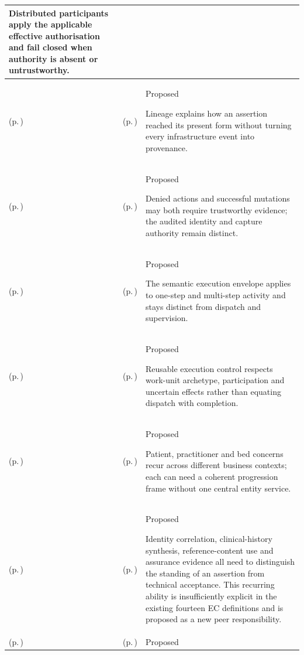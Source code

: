 \begin{longtable}{|>{\raggedright\arraybackslash}p{0.27\TableWidth}|>{\raggedright\arraybackslash}p{0.27\TableWidth}|>{\raggedright\arraybackslash}p{0.46\TableWidth}|}
Distributed participants apply the applicable effective authorisation and fail closed when authority is absent or untrustworthy.\\\hline
\nameref{cap:ec-07} (p.\,\pageref{cap:ec-07}) & \nameref{cap:ec-information-attribution-lineage} (p.\,\pageref{cap:ec-information-attribution-lineage}) & Proposed

Lineage explains how an assertion reached its present form without turning every infrastructure event into provenance.\\\hline
\nameref{cap:ec-07} (p.\,\pageref{cap:ec-07}) & \nameref{cap:ec-governed-activity-audit-evidence} (p.\,\pageref{cap:ec-governed-activity-audit-evidence}) & Proposed

Denied actions and successful mutations may both require trustworthy evidence; the audited identity and capture authority remain distinct.\\\hline
\nameref{cap:ec-10} (p.\,\pageref{cap:ec-10}) & \nameref{cap:ec-operational-fulfilment-definition} (p.\,\pageref{cap:ec-operational-fulfilment-definition}) & Proposed

The semantic execution envelope applies to one-step and multi-step activity and stays distinct from dispatch and supervision.\\\hline
\nameref{cap:ec-10} (p.\,\pageref{cap:ec-10}) & \nameref{cap:ec-governed-activity-execution-control} (p.\,\pageref{cap:ec-governed-activity-execution-control}) & Proposed

Reusable execution control respects work-unit archetype, participation and uncertain effects rather than equating dispatch with completion.\\\hline
\nameref{cap:ec-10} (p.\,\pageref{cap:ec-10}) & \nameref{cap:ec-entity-relative-operational-progression} (p.\,\pageref{cap:ec-entity-relative-operational-progression}) & Proposed

Patient, practitioner and bed concerns recur across different business contexts; each can need a coherent progression frame without one central entity service.\\\hline
\nameref{cap:ec-trust-accountability-assurance} (p.\,\pageref{cap:ec-trust-accountability-assurance}) & \nameref{cap:ec-information-authority-qualification} (p.\,\pageref{cap:ec-information-authority-qualification}) & Proposed

Identity correlation, clinical-history synthesis, reference-content use and assurance evidence all need to distinguish the standing of an assertion from technical acceptance. This recurring ability is insufficiently explicit in the existing fourteen EC definitions and is proposed as a new peer responsibility.\\\hline
\nameref{cap:bec-care-administration-information-enablement} (p.\,\pageref{cap:bec-care-administration-information-enablement}) & \nameref{cap:bec-client-centred-administration} (p.\,\pageref{cap:bec-client-centred-administration}) & Proposed


\end{longtable}
